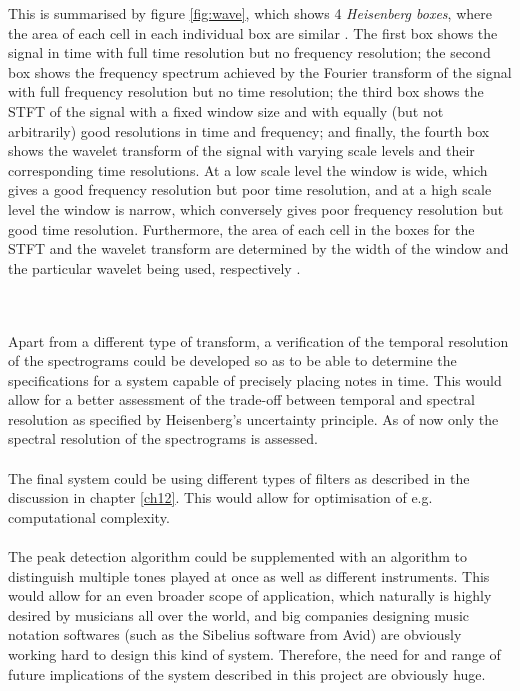 This is summarised by figure \ref{fig:wave}, which shows 4 \textit{Heisenberg boxes}, where the area of each cell in each individual box are similar \cite{page 410, Wang}. The first box shows the signal in time with full time resolution but no frequency resolution; the second box shows the frequency spectrum achieved by the Fourier transform of the signal with full frequency resolution but no time resolution; the third box shows the STFT of the signal with a fixed window size and with equally (but not arbitrarily) good resolutions in time and frequency; and finally, the fourth box shows the wavelet transform of the signal with varying scale levels and their corresponding time resolutions. At a low scale level the window is wide, which gives a good frequency resolution but poor time resolution, and at a high scale level the window is narrow, which conversely gives poor frequency resolution but good time resolution. Furthermore, the area of each cell in the boxes for the STFT and the wavelet transform are determined by the width of the window and the particular wavelet being used, respectively \cite{pages 409-410, Wang} \cite{page 43-44, wave_tut}.


\\ \\
Apart from a different type of transform, a verification of the temporal resolution of the spectrograms could be developed so as to be able to determine the specifications for a system capable of precisely placing notes in time. This would allow for a better assessment of the trade-off between temporal and spectral resolution as specified by Heisenberg's uncertainty principle. As of now only the spectral resolution of the spectrograms is assessed.
\\\\
The final system could be using different types of filters as described in the discussion in chapter \ref{ch12}. This would allow for optimisation of e.g. computational complexity.
\\\\

The peak detection algorithm could be supplemented with an algorithm to distinguish multiple tones played at once as well as different instruments. This would allow for an even broader scope of application, which naturally is highly desired by musicians all over the world, and big companies designing music notation softwares (such as the Sibelius software from Avid) are obviously working hard to design this kind of system. Therefore, the need for and range of future implications of the system described in this project are obviously huge.
